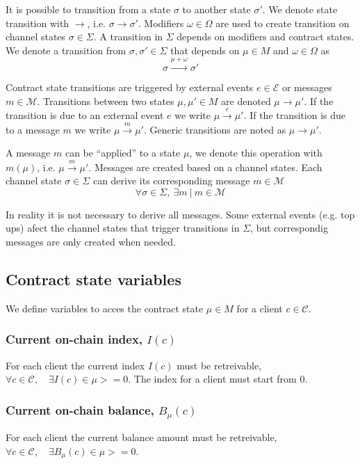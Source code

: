 \documentclass{llncs}
\begin{document}
It is possible to transition from a state $\sigma$ to another state $\sigma'$. We denote state transition with $\rightarrow$, i.e. $\sigma \rightarrow \sigma'$.  Modifiers $\omega \in \Omega$ are used to create transition on channel states $\sigma \in \Sigma$. A transition in $\Sigma$ depends on modifiers and contract states. We denote a transition from $\sigma, \sigma' \in \Sigma$ that depends on $\mu \in M$ and $\omega \in \Omega$ as
$$\sigma \xrightarrow{\mu+\omega} \sigma'$$

Contract state transitions are triggered by external events $e \in \mathcal{E}$ or messages $m \in \mathcal{M}$. Transitions between two states $\mu, \mu' \in M$ are denoted $\mu \rightarrow \mu '$. If the transition is due to an external event $e$ we write $\mu \xrightarrow{e} \mu '$. If the transition is due to a message $m$ we write $\mu \xrightarrow{m} \mu '$. Generic transitions are noted as $\mu \rightarrow \mu '$.

A message $m$ can be ``applied'' to a state $\mu$, we denote this operation with $m(\mu)$, i.e. $\mu \xrightarrow{m} \mu'$. Messages are created based on a channel states. Each channel state $\sigma \in \Sigma$ can derive its corresponding message $m \in \mathcal{M}$
$$\forall \sigma \in \Sigma,\ \exists m\ |\ m \in \mathcal{M}$$

In reality it is not necessary to derive all messages. Some external events (e.g. top ups) afect the channel states that trigger transitions in $\Sigma$, but correspondig messages are only created when needed.

\subsection{Contract state variables} We define variables to acces the contract state $\mu \in M$ for a client $c \in \mathcal{C}$.

\subsubsection{Current on-chain index, $I(c)$} For each client the current index $I(c)$ must be retreivable, $\forall c \in \mathcal{C}, \quad \exists I(c) \in \mu >= 0$. The index for a client must start from $0$.

\subsubsection{Current on-chain balance, $B_\mu(c)$} For each client the current balance amount must be retreivable, $\forall c \in \mathcal{C}, \quad \exists B_\mu(c) \in \mu >= 0$.
\end{document}
